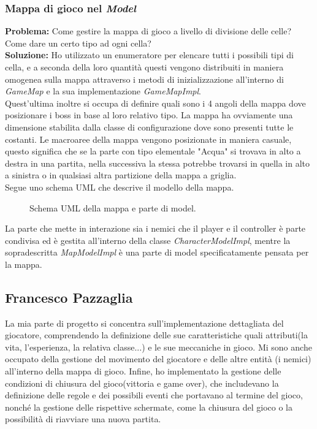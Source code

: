 \documentclass[a4paper,12pt]{report}
\begin{document}
\subsubsection{Mappa di gioco nel \textit{Model}}
\textbf{Problema:} Come gestire la mappa di gioco a livello di divisione delle celle? Come dare un certo tipo ad ogni cella?\\
\textbf{Soluzione:} Ho utilizzato un enumeratore per elencare tutti i possibili tipi di cella, e a seconda della loro quantità questi vengono distribuiti in maniera omogenea sulla mappa attraverso i metodi di inizializzazione all'interno di \textit{GameMap} e la sua implementazione \textit{GameMapImpl}.\\ Quest'ultima inoltre si occupa di definire quali sono i 4 angoli della mappa dove posizionare i boss in base al loro relativo tipo. La mappa ha ovviamente una dimensione stabilita dalla classe di configurazione dove sono presenti tutte le costanti.
Le macroaree della mappa vengono posizionate in maniera casuale, questo significa che se la parte con tipo elementale "Acqua" si trovava in alto a destra in una partita, nella successiva la stessa potrebbe trovarsi in quella in alto a sinistra o in qualsiasi altra partizione della mappa a griglia.\\
Segue uno schema UML che descrive il modello della mappa.

\begin{figure}[H]
	\centering
	
	\caption{Schema UML della mappa e parte di model.}
	\label{fig:Schema UML della mappa e parte di model.}
\end{figure}

La parte che mette in interazione sia i nemici che il player e il controller è parte condivisa ed è gestita all'interno della classe \textit{CharacterModelImpl}, mentre la sopradescritta \textit{MapModelImpl} è una parte di model specificatamente pensata per la mappa.

\subsection*{Francesco Pazzaglia}
La mia parte di progetto si concentra sull'implementazione dettagliata del giocatore, comprendendo la definizione delle sue caratteristiche quali attributi(la vita, l'esperienza, la relativa classe...) e le sue meccaniche in gioco. Mi sono anche occupato della gestione del movimento del giocatore e delle altre entità (i nemici) all'interno della mappa di gioco. Infine, ho implementato la gestione delle condizioni di chiusura del gioco(vittoria e game over), che includevano la definizione delle regole e dei possibili eventi che portavano al termine del gioco, nonché la gestione delle rispettive schermate, come la chiusura del gioco o la possibilità di riavviare una nuova partita.
\end{document}
